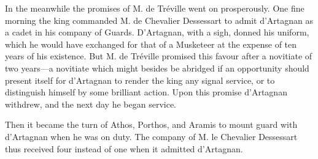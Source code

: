 In the meanwhile the promises of M. de Tréville went on prosperously. One fine morning the king commanded M. de Chevalier Dessessart to admit d'Artagnan as a cadet in his company of Guards. D'Artagnan, with a sigh, donned his uniform, which he would have exchanged for that of a Musketeer at the expense of ten years of his existence. But M. de Tréville promised this favour after a novitiate of two years---a novitiate which might besides be abridged if an opportunity should present itself for d'Artagnan to render the king any signal service, or to distinguish himself by some brilliant action. Upon this promise d'Artagnan withdrew, and the next day he began service. 

Then it became the turn of Athos, Porthos, and Aramis to mount guard with d'Artagnan when he was on duty. The company of M. le Chevalier Dessessart thus received four instead of one when it admitted d'Artagnan.
